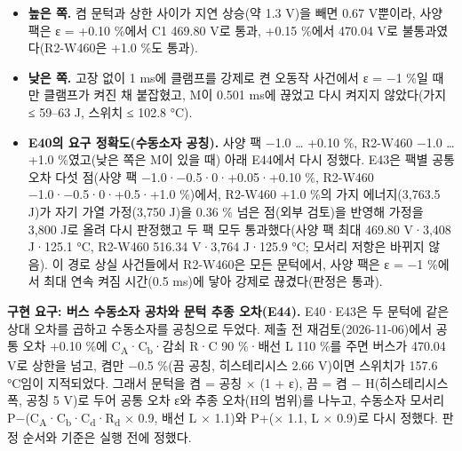 \begin{itemize}
\item \textbf{높은 쪽.} 켬 문턱과 상한 사이가 지연 상승(약 1.3 V)을 빼면 0.67 V뿐이라, 사양 팩은 ε = +0.10 \%에서 C1 469.80 V로 통과, +0.15 \%에서 470.04 V로 불통과였다(R2-W460은 +1.0 \%도 통과).
\item \textbf{낮은 쪽.} 고장 없이 1 ms에 클램프를 강제로 켠 오동작 사건에서 ε = −1 \%일 때만 클램프가 켜진 채 붙잡혔고, M이 0.501 ms에 끊었고 다시 켜지지 않았다(가지 ≤ 59–63 J, 스위치 ≤ 102.8 °C).
\item \textbf{E40의 요구 정확도(수동소자 공칭).} 사양 팩 −1.0 … +0.10 \%, R2-W460 −1.0 … +1.0 \%였고(낮은 쪽은 M이 있을 때) 아래 E44에서 다시 정했다. E43은 팩별 공통 오차 다섯 점(사양 팩 −1.0·−0.5·0·+0.05·+0.10 \%, R2-W460 −1.0·−0.5·0·+0.5·+1.0 \%)에서, R2-W460 +1.0 \%의 가지 에너지(3,763.5 J)가 자기 가열 가정(3,750 J)을 0.36 \% 넘은 점(외부 검토)을 반영해 가정을 3,800 J로 올려 다시 판정했고 두 팩 모두 통과했다(사양 팩 최대 469.80 V·3,408 J·125.1 °C, R2-W460 516.34 V·3,764 J·125.9 °C; 모서리 저항은 바뀌지 않음). 이 경로 상실 사건들에서 R2-W460은 모든 문턱에서, 사양 팩은 ε = −1 \%에서 최대 연속 켜짐 시간(0.5 ms)에 닿아 강제로 끊겼다(판정은 통과).
\end{itemize}

\textbf{구현 요구: 버스 수동소자 공차와 문턱 추종 오차(E44).} E40·E43은 두 문턱에 같은 상대 오차를 곱하고 수동소자를 공칭으로 두었다. 제출 전 재검토(2026-11-06)에서 공통 오차 +0.10 \%에 C\textsubscript{A}·C\textsubscript{b}·감쇠 R·C 90 \%·배선 L 110 \%를 주면 버스가 470.04 V로 상한을 넘고, 켬만 −0.5 \%(끔 공칭, 히스테리시스 2.66 V)이면 스위치가 157.6 °C임이 지적되었다. 그래서 문턱을 켬 = 공칭 × (1 + ε), 끔 = 켬 − H(히스테리시스 폭, 공칭 5 V)로 두어 공통 오차 ε와 추종 오차(H의 범위)를 나누고, 수동소자 모서리 P−(C\textsubscript{A}·C\textsubscript{b}·C\textsubscript{d}·R\textsubscript{d} × 0.9, 배선 L × 1.1)와 P+(× 1.1, L × 0.9)로 다시 정했다. 판정 순서와 기준은 실행 전에 정했다.

